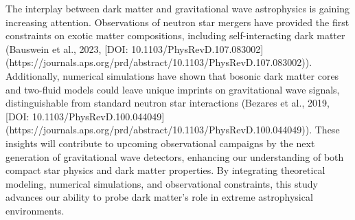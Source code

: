 The interplay between dark matter and gravitational wave astrophysics is gaining increasing attention. Observations of neutron star mergers have provided the first constraints on exotic matter compositions, including self-interacting dark matter (Bauswein et al., 2023, [DOI: 10.1103/PhysRevD.107.083002](https://journals.aps.org/prd/abstract/10.1103/PhysRevD.107.083002)). Additionally, numerical simulations have shown that bosonic dark matter cores and two-fluid models could leave unique imprints on gravitational wave signals, distinguishable from standard neutron star interactions (Bezares et al., 2019, [DOI: 10.1103/PhysRevD.100.044049](https://journals.aps.org/prd/abstract/10.1103/PhysRevD.100.044049)). These insights will contribute to upcoming observational campaigns by the next generation of gravitational wave detectors, enhancing our understanding of both compact star physics and dark matter properties. By integrating theoretical modeling, numerical simulations, and observational constraints, this study advances our ability to probe dark matter’s role in extreme astrophysical environments.  